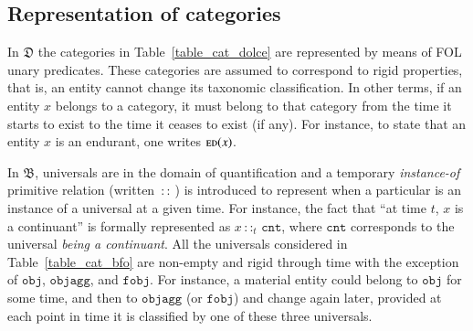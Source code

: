 \documentclass[ao]{iosart2x}
\newcommand{\nb}[1]{\textcolor{red}{$|$}\marginpar{\hspace*{-0cm}\parbox{20mm}{\scriptsize\raggedright\textcolor{red}{#1}}}}
\newcommand{\cn}[1]{\mathtt{#1}}
\newcommand {\thdolce} {\ensuremath{\mathfrak{D}}}
\newcommand {\thbfo} {\ensuremath{\mathfrak{B}}}
\newcommand {\EDdcat} {\textsc{ed}}
\newcommand{\cntbcat}{\cn{cnt}}
\newcommand{\objbcat}{\cn{obj}}
\newcommand{\fobjbcat}{\cn{fobj}}
\newcommand{\objaggbcat}{\cn{objagg}}
\newcommand{\bfoiof}[1]{{\,::_{#1\:\!}}}
\begin{document}
\subsection{Representation of categories}\label{sect_problem_univ}

In  {$\thdolce$} the categories in  Table~\ref{table_cat_dolce} are represented by means of FOL unary predicates. These categories are assumed to correspond to rigid properties, that is, an entity cannot change its taxonomic classification. In other terms, if an entity $x$ belongs to a category, it must belong to that category from the time it starts to exist to the time it ceases to exist (if any). For instance, to state that an entity $x$ is an endurant, one writes $\EDdcat(x)$.  

In {$\thbfo$}, universals are in the domain of quantification and a temporary \emph{instance-of} primitive relation (written $\bfoiof{}$) is introduced to represent when a particular is an instance of a universal at a given time. For instance, the fact that ``at time $t$, $x$ is a continuant'' is formally represented as $x \bfoiof{t} \cntbcat$, where $\cntbcat$ corresponds to the universal \emph{being a continuant}.
All the universals considered in Table~\ref{table_cat_bfo} are non-empty and rigid through time %
with the exception of $\objbcat$, $\objaggbcat$, and $\fobjbcat$. For instance, a material entity could belong to $\objbcat$ for some time, and then to $\objaggbcat$ (or $\fobjbcat$) and change again later, provided at each point in time it is classified by one of these three universals.
\end{document}
